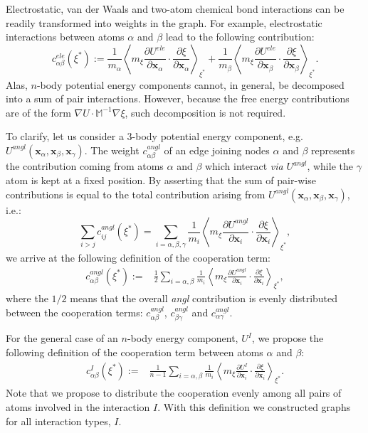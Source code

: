 \documentclass[a4paper,11pt,twoside]{book}%
\begin{document}
Electrostatic, van der Waals and two-atom chemical bond interactions can be readily transformed into weights in the graph.
For example, electrostatic interactions between atoms $\alpha$ and $\beta$ lead to the following contribution:
\begin{equation}
c_{\alpha\beta}^{ele}(\xi^*):= \frac{1}{m_\alpha} \left\langle m_\xi \frac{\partial U^{ele}}{\partial \mathbf{x}_\alpha}\cdot\frac{\partial\xi}{\partial\mathbf{x}_\alpha} \right\rangle_{\xi^*}  + \frac{1}{m_\beta} \left\langle m_\xi \frac{\partial U^{ele}}{\partial \mathbf{x}_\beta}\cdot\frac{\partial\xi}{\partial\mathbf{x}_\beta} \right \rangle_{\xi^*} .
\end{equation}
Alas, $n$-body potential energy components cannot, in general, be decomposed into a sum of pair interactions.
However, because the free energy contributions are of the form $\nabla U\cdot\mathbb{M}^{-1}\nabla\xi$, such decomposition is not required.

To clarify, let us consider a 3-body potential energy component, e.g. $U^{angl}(\mathbf{x}_\alpha,\mathbf{x}_\beta,\mathbf{x}_\gamma)$.
The weight $c^{angl}_{\alpha\beta}$ of an edge joining nodes $\alpha$ and $\beta$  represents the contribution coming from atoms $\alpha$ and $\beta$ which interact \emph{via} $U^{angl}$, while the $\gamma$ atom is kept at a fixed position.
By asserting that the sum of pair-wise contributions is equal to the total contribution arising from $U^{angl}(\mathbf{x}_\alpha,\mathbf{x}_\beta,\mathbf{x}_\gamma)$, i.e.:
$$\sum_{i>j}c^{angl}_{ij}(\xi^*)=\sum_{i=\alpha,\beta,\gamma}\frac{1}{m_i} \left\langle m_\xi \frac{\partial U^{angl}}{\partial \mathbf{x}_i}\cdot\frac{\partial\xi}{\partial\mathbf{x}_i} \right\rangle_{\xi^*},$$
we arrive at the following definition of the cooperation term:
\begin{align}
\nonumber c_{\alpha\beta}^{angl}(\xi^*):=&\frac{1}{2}\sum_{i=\alpha,\beta}\frac{1}{m_i} \left\langle m_\xi \frac{\partial U^{angl}}{\partial \mathbf{x}_i}\cdot\frac{\partial\xi}{\partial\mathbf{x}_i} \right\rangle_{\xi^*},
\end{align}
where the $1/2$ means that the overall \emph{angl} contribution is evenly distributed between the cooperation terms: $c_{\alpha\beta}^{angl}$, $c_{\beta\gamma}^{angl}$ and $c_{\alpha\gamma}^{angl}$.

For the general case of an $n$-body energy component, $U^I$, we propose the following definition of the cooperation term between atoms $\alpha$ and $\beta$:
\begin{align}
\nonumber c_{\alpha\beta}^{I}(\xi^*):=&\frac{1}{n-1}\sum_{i=\alpha,\beta}\frac{1}{m_i} \left\langle m_\xi \frac{\partial U^{I}}{\partial \mathbf{x}_i}\cdot\frac{\partial\xi}{\partial\mathbf{x}_i} \right\rangle_{\xi^*}.
\end{align}
Note that we propose to distribute the cooperation evenly among all pairs of atoms involved in the interaction $I$.
With this definition we constructed graphs for all interaction types, $I$.
\end{document}
